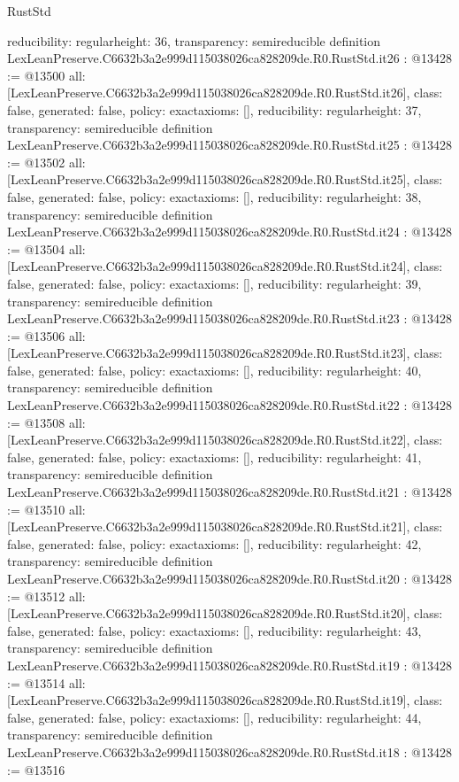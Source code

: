 \begin{lexlean}{RustStd}
\begin{coremodule}
{  reducibility: regular{height: 36},
  transparency: semireducible
}
definition LexLeanPreserve.C6632b3a2e999d115038026ca828209de.R0.RustStd.it26 : @13428 := @13500 {
  all: [LexLeanPreserve.C6632b3a2e999d115038026ca828209de.R0.RustStd.it26],
  class: false,
  generated: false,
  policy: exact{axioms: []},
  reducibility: regular{height: 37},
  transparency: semireducible
}
definition LexLeanPreserve.C6632b3a2e999d115038026ca828209de.R0.RustStd.it25 : @13428 := @13502 {
  all: [LexLeanPreserve.C6632b3a2e999d115038026ca828209de.R0.RustStd.it25],
  class: false,
  generated: false,
  policy: exact{axioms: []},
  reducibility: regular{height: 38},
  transparency: semireducible
}
definition LexLeanPreserve.C6632b3a2e999d115038026ca828209de.R0.RustStd.it24 : @13428 := @13504 {
  all: [LexLeanPreserve.C6632b3a2e999d115038026ca828209de.R0.RustStd.it24],
  class: false,
  generated: false,
  policy: exact{axioms: []},
  reducibility: regular{height: 39},
  transparency: semireducible
}
definition LexLeanPreserve.C6632b3a2e999d115038026ca828209de.R0.RustStd.it23 : @13428 := @13506 {
  all: [LexLeanPreserve.C6632b3a2e999d115038026ca828209de.R0.RustStd.it23],
  class: false,
  generated: false,
  policy: exact{axioms: []},
  reducibility: regular{height: 40},
  transparency: semireducible
}
definition LexLeanPreserve.C6632b3a2e999d115038026ca828209de.R0.RustStd.it22 : @13428 := @13508 {
  all: [LexLeanPreserve.C6632b3a2e999d115038026ca828209de.R0.RustStd.it22],
  class: false,
  generated: false,
  policy: exact{axioms: []},
  reducibility: regular{height: 41},
  transparency: semireducible
}
definition LexLeanPreserve.C6632b3a2e999d115038026ca828209de.R0.RustStd.it21 : @13428 := @13510 {
  all: [LexLeanPreserve.C6632b3a2e999d115038026ca828209de.R0.RustStd.it21],
  class: false,
  generated: false,
  policy: exact{axioms: []},
  reducibility: regular{height: 42},
  transparency: semireducible
}
definition LexLeanPreserve.C6632b3a2e999d115038026ca828209de.R0.RustStd.it20 : @13428 := @13512 {
  all: [LexLeanPreserve.C6632b3a2e999d115038026ca828209de.R0.RustStd.it20],
  class: false,
  generated: false,
  policy: exact{axioms: []},
  reducibility: regular{height: 43},
  transparency: semireducible
}
definition LexLeanPreserve.C6632b3a2e999d115038026ca828209de.R0.RustStd.it19 : @13428 := @13514 {
  all: [LexLeanPreserve.C6632b3a2e999d115038026ca828209de.R0.RustStd.it19],
  class: false,
  generated: false,
  policy: exact{axioms: []},
  reducibility: regular{height: 44},
  transparency: semireducible
}
definition LexLeanPreserve.C6632b3a2e999d115038026ca828209de.R0.RustStd.it18 : @13428 := @13516 {
}
\end{coremodule}
\end{lexlean}
